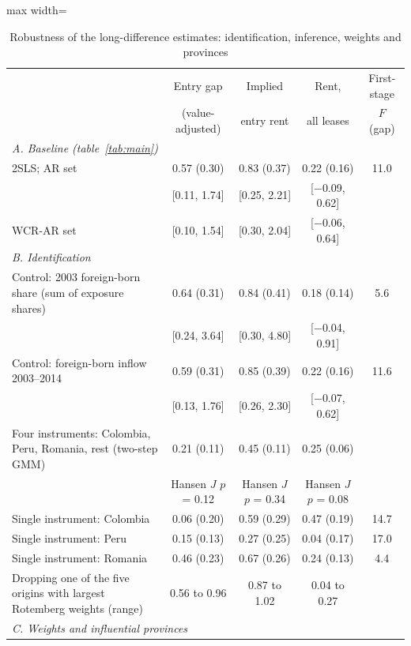 \begin{table}[!htbp]\centering\small
\caption{Robustness of the long-difference estimates: identification, inference, weights and provinces}\label{tab:robust}
\begin{adjustbox}{max width=\linewidth}\begin{tabular}{lcccc}\toprule
 & Entry gap & Implied & Rent, & First-stage\\
 & (value-adjusted) & entry rent & all leases & $F$ (gap)\\\midrule
\multicolumn{5}{l}{\textit{A. Baseline (table~\ref{tab:main})}}\\
2SLS; AR set & 0.57 (0.30) & 0.83 (0.37) & 0.22 (0.16) & 11.0\\
 & {\footnotesize [0.11, 1.74]} & {\footnotesize [0.25, 2.21]} & {\footnotesize [$-$0.09, 0.62]} & \\
{\footnotesize WCR-AR set} & {\footnotesize [0.10, 1.54]} & {\footnotesize [0.30, 2.04]} & {\footnotesize [$-$0.06, 0.64]} & \\
\multicolumn{5}{l}{\textit{B. Identification}}\\
Control: 2003 foreign-born share (sum of exposure shares) & 0.64 (0.31) & 0.84 (0.41) & 0.18 (0.14) & 5.6\\
 & {\footnotesize [0.24, 3.64]} & {\footnotesize [0.30, 4.80]} & {\footnotesize [$-$0.04, 0.91]} & \\
Control: foreign-born inflow 2003--2014 & 0.59 (0.31) & 0.85 (0.39) & 0.22 (0.16) & 11.6\\
 & {\footnotesize [0.13, 1.76]} & {\footnotesize [0.26, 2.30]} & {\footnotesize [$-$0.07, 0.62]} & \\
Four instruments: Colombia, Peru, Romania, rest (two-step GMM) & 0.21 (0.11) & 0.45 (0.11) & 0.25 (0.06) & \\
 & {\footnotesize Hansen $J$ $p$ = 0.12} & {\footnotesize Hansen $J$ $p$ = 0.34} & {\footnotesize Hansen $J$ $p$ = 0.08} & \\
Single instrument: Colombia & 0.06 (0.20) & 0.59 (0.29) & 0.47 (0.19) & 14.7\\
Single instrument: Peru & 0.15 (0.13) & 0.27 (0.25) & 0.04 (0.17) & 17.0\\
Single instrument: Romania & 0.46 (0.23) & 0.67 (0.26) & 0.24 (0.13) & 4.4\\
Dropping one of the five origins with largest Rotemberg weights (range) & 0.56 to 0.96 & 0.87 to 1.02 & 0.04 to 0.27 & \\
\multicolumn{5}{l}{\textit{C. Weights and influential provinces}}\\

\end{tabular}
\end{adjustbox}
\end{table}

